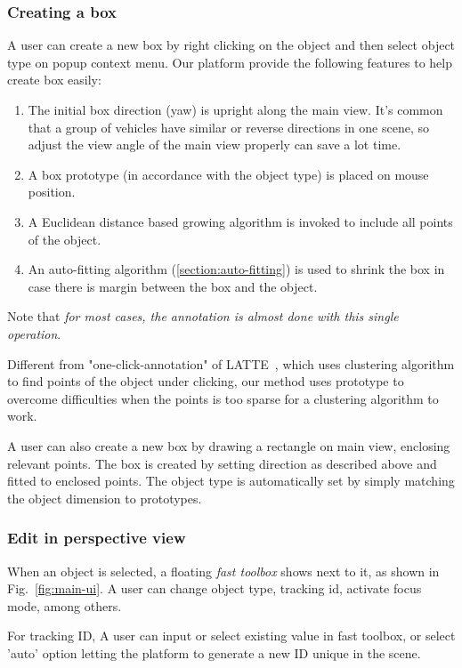 \documentclass[letterpaper, 10 pt, conference]{ieeeconf}  %
\begin{document}
\subsubsection{Creating a box}
\label{section:create-box}
A user can create a new box by right clicking on the object  and then select object type on popup context menu. Our platform provide the following features to help create box easily:

\begin{enumerate}
	\item The initial box direction (yaw) is upright along the main view. It's common that a group of vehicles have similar or reverse directions in one scene, so adjust the view angle of the main view properly can save a lot time.
	\item A box prototype (in accordance with the object type) is placed on mouse position.
	\item A Euclidean distance based growing algorithm is invoked to include all points of the object.
	\item An auto-fitting algorithm (\ref{section:auto-fitting}) is used to shrink the box in case there is margin between the box and the object.
\end{enumerate}

Note that \emph{for most cases, the annotation is almost done with this single operation}.

Different from "one-click-annotation" of LATTE~\cite{pointatme}, which uses clustering algorithm to find points of the object under clicking, our method uses prototype to overcome difficulties when the points is too sparse for a clustering algorithm to work.

A user can also create a new box by drawing a rectangle on main view,  enclosing relevant points. The box is created by setting direction  as described above and fitted to enclosed points. The object type is automatically set by simply matching the object dimension to prototypes.


\subsubsection{Edit in perspective view}

When an object is selected, a floating \emph{fast toolbox} shows next to it, as shown in Fig.~\ref{fig:main-ui}. A user can change object type, tracking id, activate focus mode, among others.

For tracking ID, A user  can input or select existing value in fast toolbox, or select 'auto' option  letting the platform to generate a new ID unique in the scene.
\end{document}
